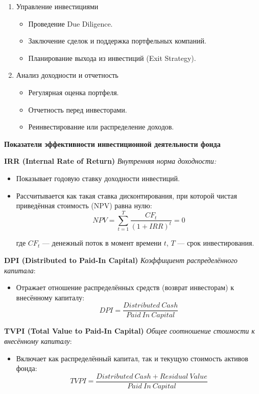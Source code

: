 \begin{enumerate}
    \item Управление инвестициями
        \begin{itemize}
            \item Проведение Due Diligence.
            \item Заключение сделок и поддержка портфельных компаний.
            \item Планирование выхода из инвестиций (Exit Strategy).
        \end{itemize}
    \item Анализ доходности и отчетность
        \begin{itemize}
            \item Регулярная оценка портфеля.
            \item Отчетность перед инвесторами.
            \item Реинвестирование или распределение доходов.
        \end{itemize}
\end{enumerate}


\textbf{Показатели эффективности инвестиционной деятельности фонда}

\textbf{IRR (Internal Rate of Return)}
\textit{Внутренняя норма доходности:}
\begin{itemize}
    \item Показывает годовую ставку доходности инвестиций.
    \item Рассчитывается как такая ставка дисконтирования, при которой чистая приведённая стоимость (NPV) равна нулю:
    \begin{equation}
        NPV = \sum_{t=1}^{T} \frac{CF_t}{(1+IRR)^t} = 0
    \end{equation}

    \noindent где $CF_t$ --- денежный поток в момент времени $t$, $T$ --- срок инвестирования.
\end{itemize}

\textbf{DPI (Distributed to Paid-In Capital)}
\textit{Коэффициент распределённого капитала}:
\begin{itemize}
    \item Отражает отношение распределённых средств (возврат инвесторам) к внесённому капиталу:
    \begin{equation}
        DPI = \frac{Distributed\ Cash}{Paid\ In\ Capital}
    \end{equation}
\end{itemize}

\textbf{TVPI (Total Value to Paid-In Capital)}
\textit{Общее соотношение стоимости к внесённому капиталу}:
\begin{itemize}
    \item Включает как распределённый капитал, так и текущую стоимость активов фонда:
    \begin{equation}
        TVPI = \frac{Distributed\ Cash + Residual\ Value}{Paid\ In\ Capital}
    \end{equation}
\end{itemize}

